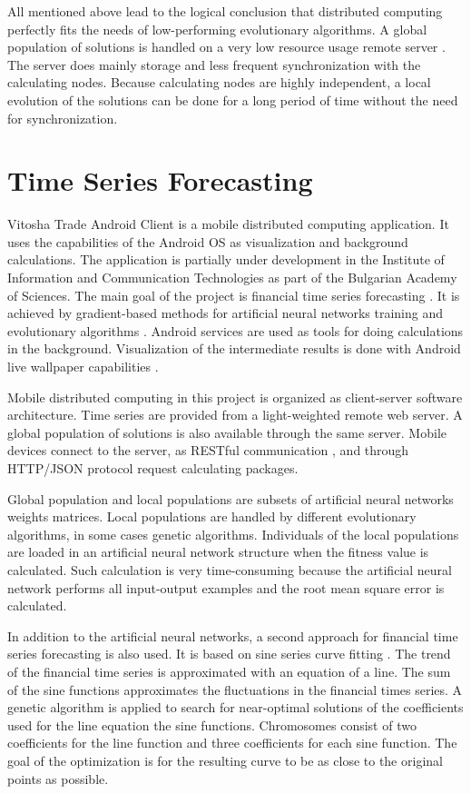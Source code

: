 \documentclass[conference]{IEEEtran}
\begin{document}
All mentioned above lead to the logical conclusion that distributed computing perfectly fits the needs of low-performing evolutionary algorithms. A global population of solutions is handled on a very low resource usage remote server \cite{Gong-2015-a}. The server does mainly storage and less frequent synchronization with the calculating nodes. Because calculating nodes are highly independent, a local evolution of the solutions can be done for a long period of time without the need for synchronization. 

\section{Time Series Forecasting}

Vitosha Trade Android Client \cite{Balabanov-2022-a} is a mobile distributed computing application. It uses the capabilities of the Android OS as visualization and background calculations. The application is partially under development in the Institute of Information and Communication Technologies as part of the Bulgarian Academy of Sciences. The main goal of the project is financial time series forecasting \cite{Kolarik-1994-a}. It is achieved by gradient-based methods for artificial neural networks training \cite{Tomov-2021-a} and evolutionary algorithms \cite{Tomov-2021-b}. Android services are used as tools for doing calculations in the background. Visualization of the intermediate results is done with Android live wallpaper capabilities \cite{Mateeva-2021-a}. 

Mobile distributed computing in this project is organized as client-server \cite{Sinha-1992-a} software architecture. Time series are provided from a light-weighted remote web server. A global population of solutions is also available through the same server. Mobile devices connect to the server, as RESTful communication \cite{Orellana-2012-a}, and through HTTP/JSON protocol request calculating packages. 

Global population and local populations are subsets of artificial neural networks weights matrices. Local populations are handled by different evolutionary algorithms, in some cases genetic algorithms. Individuals of the local populations are loaded in an artificial neural network structure when the fitness value is calculated. Such calculation is very time-consuming because the artificial neural network performs all input-output examples and the root mean square error is calculated. 

In addition to the artificial neural networks, a second approach for financial time series forecasting is also used. It is based on sine series curve fitting \cite{Iliev-2021-a}. The trend of the financial time series is approximated with an equation of a line. The sum of the sine functions approximates the fluctuations in the financial times series. A genetic algorithm is applied to search for near-optimal solutions of the coefficients used for the line equation the sine functions. Chromosomes consist of two coefficients for the line function and three coefficients for each sine function. The goal of the optimization is for the resulting curve to be as close to the original points as possible. 
\end{document}
